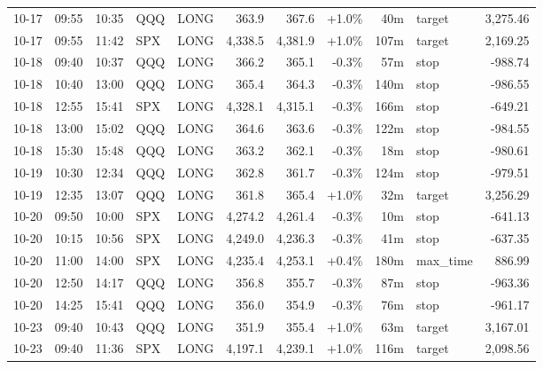 \documentclass[11pt,a4paper,twoside]{article}
\begin{document}
\begin{center}
\begin{longtable}{>{\color{txtmain}}l l l l l r r r r >{\color{txtmain}}l r}
10-17 & 09:55 & 10:35 & QQQ & LONG & 363.9 & 367.6 & \textcolor{wingreen}{+1.0\%} & 40m & target & \textcolor{wingreen}{3,275.46} \\
10-17 & 09:55 & 11:42 & SPX & LONG & 4,338.5 & 4,381.9 & \textcolor{wingreen}{+1.0\%} & 107m & target & \textcolor{wingreen}{2,169.25} \\
10-18 & 09:40 & 10:37 & QQQ & LONG & 366.2 & 365.1 & \textcolor{lossred}{-0.3\%} & 57m & stop & \textcolor{lossred}{-988.74} \\
10-18 & 10:40 & 13:00 & QQQ & LONG & 365.4 & 364.3 & \textcolor{lossred}{-0.3\%} & 140m & stop & \textcolor{lossred}{-986.55} \\
10-18 & 12:55 & 15:41 & SPX & LONG & 4,328.1 & 4,315.1 & \textcolor{lossred}{-0.3\%} & 166m & stop & \textcolor{lossred}{-649.21} \\
10-18 & 13:00 & 15:02 & QQQ & LONG & 364.6 & 363.6 & \textcolor{lossred}{-0.3\%} & 122m & stop & \textcolor{lossred}{-984.55} \\
10-18 & 15:30 & 15:48 & QQQ & LONG & 363.2 & 362.1 & \textcolor{lossred}{-0.3\%} & 18m & stop & \textcolor{lossred}{-980.61} \\
10-19 & 10:30 & 12:34 & QQQ & LONG & 362.8 & 361.7 & \textcolor{lossred}{-0.3\%} & 124m & stop & \textcolor{lossred}{-979.51} \\
10-19 & 12:35 & 13:07 & QQQ & LONG & 361.8 & 365.4 & \textcolor{wingreen}{+1.0\%} & 32m & target & \textcolor{wingreen}{3,256.29} \\
10-20 & 09:50 & 10:00 & SPX & LONG & 4,274.2 & 4,261.4 & \textcolor{lossred}{-0.3\%} & 10m & stop & \textcolor{lossred}{-641.13} \\
10-20 & 10:15 & 10:56 & SPX & LONG & 4,249.0 & 4,236.3 & \textcolor{lossred}{-0.3\%} & 41m & stop & \textcolor{lossred}{-637.35} \\
10-20 & 11:00 & 14:00 & SPX & LONG & 4,235.4 & 4,253.1 & \textcolor{wingreen}{+0.4\%} & 180m & max\_time & \textcolor{wingreen}{886.99} \\
10-20 & 12:50 & 14:17 & QQQ & LONG & 356.8 & 355.7 & \textcolor{lossred}{-0.3\%} & 87m & stop & \textcolor{lossred}{-963.36} \\
10-20 & 14:25 & 15:41 & QQQ & LONG & 356.0 & 354.9 & \textcolor{lossred}{-0.3\%} & 76m & stop & \textcolor{lossred}{-961.17} \\
10-23 & 09:40 & 10:43 & QQQ & LONG & 351.9 & 355.4 & \textcolor{wingreen}{+1.0\%} & 63m & target & \textcolor{wingreen}{3,167.01} \\
10-23 & 09:40 & 11:36 & SPX & LONG & 4,197.1 & 4,239.1 & \textcolor{wingreen}{+1.0\%} & 116m & target & \textcolor{wingreen}{2,098.56} \\

\end{longtable}
\end{center}
\end{document}
